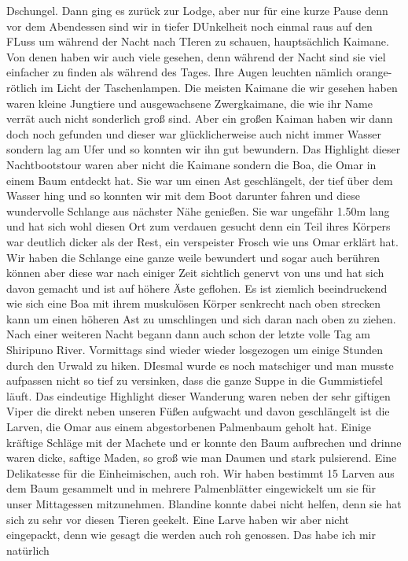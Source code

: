 \documentclass[11pt]{book}
\begin{document}
Dschungel. Dann ging es zurück zur Lodge, aber nur für eine kurze Pause denn vor dem Abendessen sind wir in tiefer DUnkelheit noch einmal raus auf den 
FLuss um während der Nacht nach TIeren zu schauen, hauptsächlich Kaimane. Von denen haben wir auch viele gesehen, denn während der Nacht sind sie 
viel einfacher zu finden als während des Tages. Ihre Augen leuchten nämlich orange-rötlich im Licht der Taschenlampen. Die meisten Kaimane die wir 
gesehen haben waren kleine Jungtiere und ausgewachsene Zwergkaimane, die wie ihr Name verrät auch nicht sonderlich groß sind. Aber ein großen Kaiman 
haben wir dann doch noch gefunden und dieser war glücklicherweise auch nicht immer Wasser sondern lag am Ufer und so konnten wir ihn gut bewundern. 
Das Highlight dieser Nachtbootstour waren aber nicht die Kaimane sondern die Boa, die Omar in einem Baum entdeckt hat. Sie war um einen Ast geschlängelt, 
der tief über dem Wasser hing und so konnten wir mit dem Boot darunter fahren und diese wundervolle Schlange aus nächster Nähe genießen. Sie war ungefähr 
1.50m lang und hat sich wohl diesen Ort zum verdauen gesucht denn ein Teil ihres Körpers war deutlich dicker als der Rest, ein verspeister Frosch wie uns 
Omar erklärt hat. Wir haben die Schlange eine ganze weile bewundert und sogar auch berühren können aber diese war nach einiger Zeit sichtlich genervt 
von uns und hat sich davon gemacht und ist auf höhere Äste geflohen. Es ist ziemlich beeindruckend wie sich eine Boa mit ihrem muskulösen Körper senkrecht 
nach oben strecken kann um einen höheren Ast zu umschlingen und sich daran nach oben zu ziehen. 
Nach einer weiteren Nacht begann dann auch schon der letzte volle Tag am Shiripuno River. Vormittags sind wieder wieder losgezogen um einige Stunden 
durch den Urwald zu hiken. DIesmal wurde es noch matschiger und man musste aufpassen nicht so tief zu versinken, dass die ganze Suppe in die Gummistiefel 
läuft. Das eindeutige Highlight dieser Wanderung waren neben der sehr giftigen Viper die direkt neben unseren Füßen aufgwacht und davon geschlängelt ist 
die Larven, die Omar aus einem abgestorbenen Palmenbaum geholt hat. Einige kräftige Schläge mit der Machete und er konnte den Baum aufbrechen und drinne 
waren dicke, saftige Maden, so groß wie man Daumen und stark pulsierend. Eine Delikatesse für die Einheimischen, auch roh. Wir haben bestimmt 15 Larven 
aus dem Baum gesammelt und in mehrere Palmenblätter eingewickelt um sie für unser Mittagessen mitzunehmen. Blandine konnte dabei nicht helfen, denn sie hat sich 
zu sehr vor diesen Tieren geekelt. Eine Larve haben wir aber nicht eingepackt, denn wie gesagt die werden auch roh genossen. Das habe ich mir natürlich 
\end{document}
